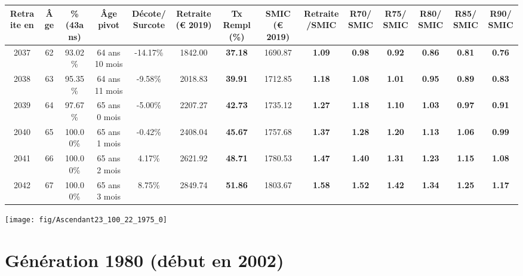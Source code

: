 \begin{adjustbox}{max width=\textwidth} 
\begin{tabular}[htb]{|c|c||c|c|c||c|c||c|c||c|c|c|c|c|} 
\hline 
 Retraite en &  Âge &  \%(43ans) &  Âge pivot &  Décote/Surcote &  Retraite (\euro{} 2019) &  Tx Rempl(\%) &  SMIC (\euro{} 2019) &  Retraite/SMIC &  R70/SMIC &  R75/SMIC &  R80/SMIC &  R85/SMIC &  R90/SMIC \\ 
\hline \hline 
 2037 &  62 &  93.02\% &  64 ans 10 mois &  -14.17\% &  1842.00 &  {\bf 37.18} &  1690.87 &  {\bf 1.09} &  {\bf {\color{red} 0.98}} &  {\bf {\color{red} 0.92}} &  {\bf {\color{red} 0.86}} &  {\bf {\color{red} 0.81}} &  {\bf {\color{red} 0.76}} \\ 
\hline 
 2038 &  63 &  95.35\% &  64 ans 11 mois &  -9.58\% &  2018.83 &  {\bf 39.91} &  1712.85 &  {\bf 1.18} &  {\bf 1.08} &  {\bf 1.01} &  {\bf {\color{red} 0.95}} &  {\bf {\color{red} 0.89}} &  {\bf {\color{red} 0.83}} \\ 
\hline 
 2039 &  64 &  97.67\% &  65 ans 0 mois &  -5.00\% &  2207.27 &  {\bf 42.73} &  1735.12 &  {\bf 1.27} &  {\bf 1.18} &  {\bf 1.10} &  {\bf 1.03} &  {\bf {\color{red} 0.97}} &  {\bf {\color{red} 0.91}} \\ 
\hline 
 2040 &  65 &  100.00\% &  65 ans 1 mois &  -0.42\% &  2408.04 &  {\bf 45.67} &  1757.68 &  {\bf 1.37} &  {\bf 1.28} &  {\bf 1.20} &  {\bf 1.13} &  {\bf 1.06} &  {\bf {\color{red} 0.99}} \\ 
\hline 
 2041 &  66 &  100.00\% &  65 ans 2 mois &  4.17\% &  2621.92 &  {\bf 48.71} &  1780.53 &  {\bf 1.47} &  {\bf 1.40} &  {\bf 1.31} &  {\bf 1.23} &  {\bf 1.15} &  {\bf 1.08} \\ 
\hline 
 2042 &  67 &  100.00\% &  65 ans 3 mois &  8.75\% &  2849.74 &  {\bf 51.86} &  1803.67 &  {\bf 1.58} &  {\bf 1.52} &  {\bf 1.42} &  {\bf 1.34} &  {\bf 1.25} &  {\bf 1.17} \\ 
\hline 
\hline 
\end{tabular} 
\end{adjustbox} 
 
 \vspace{0.1cm} 

 {\hspace{-2.2cm}\texttt{[image: fig/Ascendant23\_100\_22\_1975\_0]}} 

\newpage 
 
\section{Génération 1980 (début en 2002)\label{Ascendant23_100_22_1980_0}} 
 
